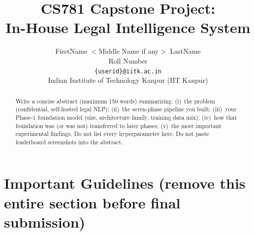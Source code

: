 \documentclass[11pt, oneside]{article}
\title{CS781 Capstone Project:\\
In-House Legal Intelligence System}
\author{
    FirstName $<$Middle Name if any$>$ LastName  \\
    Roll Number \\
    {\tt \{userid\}@iitk.ac.in}\\
    Indian Institute of Technology Kanpur (IIT Kanpur)
}
\date{}
\begin{document}
\maketitle
\begin{abstract}
Write a concise abstract (maximum 150 words) summarizing:
(i)~the problem (confidential, self-hosted legal NLP);
(ii)~the seven-phase pipeline you built;
(iii)~your Phase-1 foundation model (size, architecture family, training data mix);
(iv)~how that foundation was (or was not) transferred to later phases;
(v)~the most important experimental findings.
Do not list every hyperparameter here. Do not paste leaderboard screenshots into the abstract.
\end{abstract}
\section*{Important Guidelines
(remove this entire section before final submission)}
\end{document}
